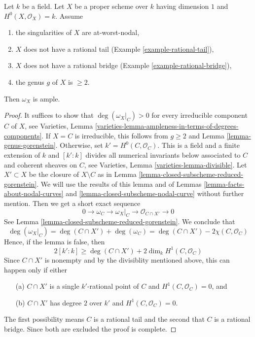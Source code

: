 \begin{lemma}
\label{lemma-no-rational-bridge-ample-genus-geq-2}
Let $k$ be a field. Let $X$ be a proper scheme over $k$ having dimension $1$
and $H^0(X, \mathcal{O}_X) = k$. Assume
\begin{enumerate}
\item the singularities of $X$ are at-worst-nodal,
\item $X$ does not have a rational tail
(Example \ref{example-rational-tail}),
\item $X$ does not have a rational bridge
(Example \ref{example-rational-bridge}),
\item the genus $g$ of $X$ is $\geq 2$.
\end{enumerate}
Then $\omega_X$ is ample.
\end{lemma}

\begin{proof}
It suffices to show that $\deg(\omega_X|_C) > 0$ for every irreducible
component $C$ of $X$, see Varieties, Lemma
\ref{varieties-lemma-ampleness-in-terms-of-degrees-components}.
If $X = C$ is irreducible, this follows from $g \geq 2$
and Lemma \ref{lemma-genus-gorenstein}.
Otherwise, set $k' = H^0(C, \mathcal{O}_C)$. This
is a field and a finite extension of $k$ and $[k' : k]$
divides all numerical invariants below associated to $C$ and
coherent sheaves on $C$, see
Varieties, Lemma \ref{varieties-lemma-divisible}.
Let $X' \subset X$ be the closure of $X \setminus C$ as in
Lemma \ref{lemma-closed-subscheme-reduced-gorenstein}.
We will use the results of this lemma and of
Lemmas \ref{lemma-facts-about-nodal-curves} and
\ref{lemma-closed-subscheme-nodal-curve} without further mention.
Then we get a short exact sequence
$$
0 \to \omega_C \to \omega_X|_C \to \mathcal{O}_{C \cap X'} \to 0
$$
See Lemma \ref{lemma-closed-subscheme-reduced-gorenstein}.
We conclude that
$$
\deg(\omega_X|_C) = \deg(C \cap X') + \deg(\omega_C) =
\deg(C \cap X') - 2\chi(C, \mathcal{O}_C)
$$
Hence, if the lemma is false, then
$$
2[k' : k] \geq \deg(C \cap X') + 2\dim_k H^1(C, \mathcal{O}_C)
$$
Since $C \cap X'$ is nonempty and by the divisiblity mentioned above,
this can happen only if either
\begin{enumerate}
\item[(a)] $C \cap X'$ is a single $k'$-rational point of $C$ and
$H^1(C, \mathcal{O}_C) = 0$, and
\item[(b)] $C \cap X'$ has degree $2$ over $k'$ and
$H^1(C, \mathcal{O}_C) = 0$.
\end{enumerate}
The first possibility means $C$ is a rational tail
and the second that $C$ is a rational bridge.
Since both are excluded the proof is complete.
\end{proof}

